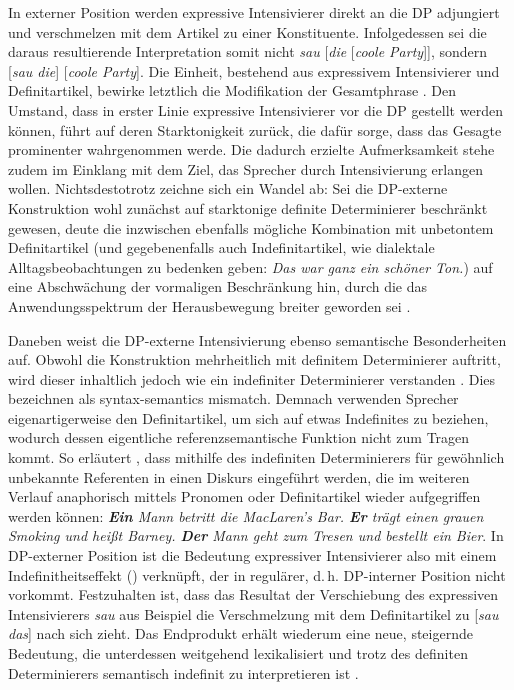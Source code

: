 \largerpage
\noindent In externer Position werden expressive Intensivierer direkt an die DP adjungiert und verschmelzen mit dem Artikel zu einer Konstituente. Infolgedessen sei die daraus resultierende Interpretation somit nicht \textit{sau} [\textit{die} [\textit{coole Party}]], sondern [\textit{sau die}] [\textit{coole Party}]. Die Einheit, bestehend aus expressivem Intensivierer und Definitartikel, bewirke letztlich die Modifikation der Gesamtphrase \citep[vgl.][160]{Gutzmann.2012}. Den Umstand, dass in erster Linie expressive Intensivierer vor die DP gestellt werden können, führt \citet[353]{Androutsopoulos.1998} auf deren Starktonigkeit zurück, die dafür sorge, dass das Gesagte prominenter wahrgenommen werde. Die dadurch erzielte Aufmerksamkeit stehe zudem im Einklang mit dem Ziel, das Sprecher durch Intensivierung erlangen wollen. Nichtsdestotrotz zeichne sich ein Wandel ab: Sei die DP-externe Konstruktion wohl zunächst auf starktonige definite Determinierer beschränkt gewesen, deute die inzwischen ebenfalls mögliche Kombination mit unbetontem Definitartikel (und gegebenenfalls auch Indefinitartikel, wie dialektale Alltagsbeobachtungen zu bedenken geben: \textit{Das war ganz ein schöner Ton.}) auf eine Abschwächung der vormaligen Beschränkung hin, durch die das Anwendungsspektrum der Herausbewegung breiter geworden sei {\citep[vgl.][353]{Androutsopoulos.1998}}.

Daneben weist die DP-externe Intensivierung ebenso semantische Besonderheiten auf. Obwohl die Konstruktion mehrheitlich mit definitem Determinierer auftritt, wird dieser inhaltlich jedoch wie ein indefiniter Determinierer verstanden \citep[vgl.][155f.]{Gutzmann.2012}. Dies bezeichnen \citet[]{Gutzmann.2012} als \glqq{}syntax-semantics mismatch\grqq{}. Demnach verwenden Sprecher eigenartigerweise den Definitartikel, um sich auf etwas Indefinites zu beziehen, wodurch dessen eigentliche referenzsemantische Funktion nicht zum Tragen kommt. So erläutert \citet[187]{Schmidlin.2015}, dass mithilfe des indefiniten Determinierers für gewöhnlich unbekannte Referenten in einen Diskurs eingeführt werden, die im weiteren Verlauf anaphorisch mittels Pronomen oder Definitartikel wieder aufgegriffen werden können: \textit{\textbf{Ein} Mann betritt die MacLaren's Bar. \textbf{Er} trägt einen grauen Smoking und heißt Barney. \textbf{Der} Mann geht zum Tresen und bestellt ein Bier}. In DP-externer Position ist die Bedeutung expressiver Intensivierer also mit einem \glqq{}Indefinitheitseffekt\grqq{} (\citealt[]{Wang.2007}) verknüpft, der in regulärer, d.\,h. DP-interner Position nicht vorkommt. Festzuhalten ist, dass das Resultat der Verschiebung des expressiven Intensivierers \textit{sau} aus Beispiel  die Verschmelzung mit dem Definitartikel zu [\textit{sau das}] nach sich zieht. Das Endprodukt erhält wiederum eine neue, steigernde Bedeutung, die unterdessen weitgehend lexikalisiert und trotz des definiten Determinierers semantisch indefinit zu interpretieren ist {\citep[vgl.][162f.]{Gutzmann.2012}}.

